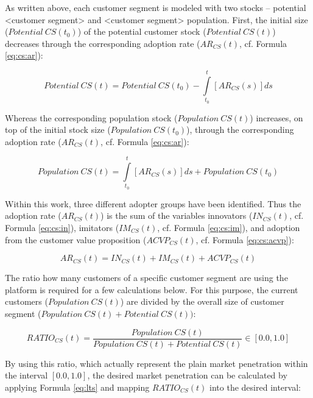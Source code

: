 As written above, each customer segment is modeled with two stocks -- potential <customer segment> and <customer segment> population. First, the initial size ($\mathit{Potential~CS(t_0)}$) of the potential customer stock \linebreak ($\mathit{Potential~CS(t)}$) decreases through the corresponding adoption rate \linebreak ($AR_{CS}(t)$, cf. Formula \ref{eq:cs:ar}):

\begin{equation}\label{eq:cs:pot}
	\mathit{Potential~CS(t)} =\mathit{Potential~CS(t_0)} - \int\limits_{t_0}^t  [AR_{CS}(s)]ds
\end{equation}

Whereas the corresponding population stock ($\mathit{Population~CS(t)}$) \linebreak increases, on top of the initial stock size ($\mathit{Population~CS(t_0)}$), through the corresponding adoption rate ($AR_{CS}(t)$, cf. Formula \ref{eq:cs:ar}):

\begin{equation}\label{eq:cs:pop}
	\mathit{Population~CS(t)} = \int\limits_{t_0}^t [AR_{CS}(s)]ds + \mathit{Population~CS(t_0)}
\end{equation}

Within this work, three different adopter groups have been identified. Thus the adoption rate ($AR_{CS}(t)$) is the sum of the variables innovators ($IN_{CS}(t)$, cf. Formula \ref{eq:cs:in}), imitators ($IM_{CS}(t)$, cf. Formula \ref{eq:cs:im}), and adoption from the customer value proposition ($ACVP_{CS}(t)$, cf. Formula \ref{eq:cs:acvp}):

\begin{equation}\label{eq:cs:ar}
		AR_{CS}(t) = IN_{CS}(t) + IM_{CS}(t) + ACVP_{CS}(t)	
\end{equation}

The ratio how many customers of a specific customer segment are using the platform is required for a few calculations below. For this purpose, the current customers ($\mathit{Population~CS(t)}$) are divided by the overall size of customer segment ($\mathit{Population~CS(t)} + \mathit{Potential~CS(t)})$:

\begin{equation}\label{eq:cs:ratio}
		RATIO_{CS}(t) = \frac{\mathit{Population~CS(t)}}{\mathit{Population~CS(t)} + \mathit{Potential~CS(t)}} \in [0.0,1.0]
\end{equation}

By using this ratio, which actually represent the plain market penetration within the interval $[0.0,1.0]$, the desired market penetration can be calculated by applying Formula \ref{eq:lts} and mapping $RATIO_{CS}(t)$ into the desired interval:


